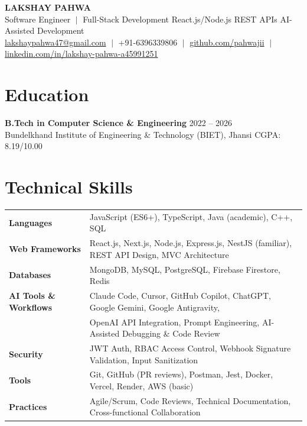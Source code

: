 \documentclass[10pt,letterpaper]{article}
\begin{document}
{\centering
  {\large \textbf{LAKSHAY PAHWA}} \\[1pt]
  \small
  Software Engineer $\;|\;$ Full-Stack Development \textbullet{} React.js/Node.js \textbullet{} REST APIs \textbullet{} AI-Assisted Development \\[1pt]
  \href{mailto:lakshaypahwa47@gmail.com}{lakshaypahwa47@gmail.com} $\;|\;$
  +91-6396339806 $\;|\;$
  \href{https://github.com/pahwajii}{github.com/pahwajii} $\;|\;$
  \href{https://linkedin.com/in/lakshay-pahwa-a45991251}{linkedin.com/in/lakshay-pahwa-a45991251}
\par}

\vspace{2pt}

\section{Education}
\vspace{1pt}
\textbf{B.Tech in Computer Science \& Engineering} \hfill {2022 -- 2026} \\
Bundelkhand Institute of Engineering \& Technology (BIET), Jhansi \hfill CGPA: 8.19/10.00

\section{Technical Skills}
\vspace{2pt}
\begin{tabular}{@{} >{\bfseries}l @{\hspace{2ex}} l}
Languages       & JavaScript (ES6+), TypeScript, Java (academic), C++, SQL \\
Web Frameworks  & React.js, Next.js, Node.js, Express.js, NestJS (familiar), REST API Design, MVC Architecture \\
Databases       & MongoDB, MySQL, PostgreSQL, Firebase Firestore, Redis \\
AI Tools \& Workflows & Claude Code, Cursor, GitHub Copilot, ChatGPT, Google Gemini, Google Antigravity, \\
                & OpenAI API Integration, Prompt Engineering, AI-Assisted Debugging \& Code Review \\
Security        & JWT Auth, RBAC Access Control, Webhook Signature Validation, Input Sanitization \\
Tools           & Git, GitHub (PR reviews), Postman, Jest, Docker, Vercel, Render, AWS (basic) \\
Practices       & Agile/Scrum, Code Reviews, Technical Documentation, Cross-functional Collaboration \\
\end{tabular}
\end{document}
